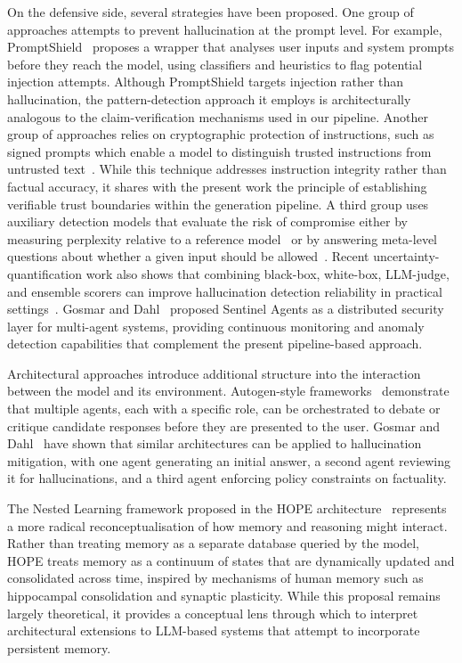 \documentclass[11pt,a4paper]{article}
\begin{document}
	On the defensive side, several strategies have been proposed. One group of approaches attempts to prevent hallucination at the prompt level. For example, PromptShield~\cite{jacob2025promptshield} proposes a wrapper that analyses user inputs and system prompts before they reach the model, using classifiers and heuristics to flag potential injection attempts. Although PromptShield targets injection rather than hallucination, the pattern-detection approach it employs is architecturally analogous to the claim-verification mechanisms used in our pipeline. Another group of approaches relies on cryptographic protection of instructions, such as signed prompts which enable a model to distinguish trusted instructions from untrusted text~\cite{suo2024}. While this technique addresses instruction integrity rather than factual accuracy, it shares with the present work the principle of establishing verifiable trust boundaries within the generation pipeline. A third group uses auxiliary detection models that evaluate the risk of compromise either by measuring perplexity relative to a reference model~\cite{gosmar2025promptinjection} or by answering meta-level questions about whether a given input should be allowed~\cite{liu2024formalizingbenchmarkingpromptinjection}. Recent uncertainty-quantification work also shows that combining black-box, white-box, LLM-judge, and ensemble scorers can improve hallucination detection reliability in practical settings~\cite{bouchard2025uncertaintyquantificationlanguagemodels}. Gosmar and Dahl~\cite{gosmar2025sentinel} proposed Sentinel Agents as a distributed security layer for multi-agent systems, providing continuous monitoring and anomaly detection capabilities that complement the present pipeline-based approach.
	
	Architectural approaches introduce additional structure into the interaction between the model and its environment. Autogen-style frameworks~\cite{autogen2024} demonstrate that multiple agents, each with a specific role, can be orchestrated to debate or critique candidate responses before they are presented to the user. Gosmar and Dahl~\cite{gosmar2025hallucination} have shown that similar architectures can be applied to hallucination mitigation, with one agent generating an initial answer, a second agent reviewing it for hallucinations, and a third agent enforcing policy constraints on factuality.
	
	The Nested Learning framework proposed in the HOPE architecture~\cite{behrouz2025nested} represents a more radical reconceptualisation of how memory and reasoning might interact. Rather than treating memory as a separate database queried by the model, HOPE treats memory as a continuum of states that are dynamically updated and consolidated across time, inspired by mechanisms of human memory such as hippocampal consolidation and synaptic plasticity. While this proposal remains largely theoretical, it provides a conceptual lens through which to interpret architectural extensions to LLM-based systems that attempt to incorporate persistent memory.
	
\end{document}

